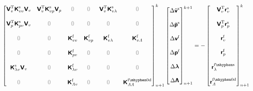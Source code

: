 \documentclass[a4paper,12pt]{report}
\newcommand{\fS}{\text{s}}
\newcommand{\fF}{\text{f}}
\newcommand{\bs}[1]{\boldsymbol{#1}}
\newcommand{\zerom}{\textcolor{lightgray}{\bs{\mathsf{0}}}}
\newcommand{\ROP}{\bs{\mathsf{r}}}
\newcommand{\VF}{\bs{\mathsf{v}}^{\fF}}
\newcommand{\PF}{\bs{\mathsf{p}}^{\fF}}
\newcommand{\LM}{\bs{\mathsf{\lambda}}}
\newcommand{\LMZ}{\bs{\mathsf{\Lambda}}}
\newcommand{\lmi}{\lambda} %
\newcommand{\lmzi}{\mathit{\Lambda}} %
\begin{document}
\begin{align}
    \begin{bmatrix} \bs{\mathsf{V}}_{v}^{\mathrm{T}}\bs{\mathsf{K}}_{vv}^{\fS}\bs{\mathsf{V}}_{v} & \bs{\mathsf{V}}_{v}^{\mathrm{T}}\bs{\mathsf{K}}_{vp}^{\fS}\bs{\mathsf{V}}_{p} & \zerom & \zerom & \bs{\mathsf{V}}_{v}^{\mathrm{T}}\bs{\mathsf{K}}_{v\lmi}^{\fS} & \zerom  \\ \\ \bs{\mathsf{V}}_{p}^{\mathrm{T}}\bs{\mathsf{K}}_{pv}^{\fS}\bs{\mathsf{V}}_{v} & \zerom & \zerom & \zerom & \zerom & \zerom \\ \\ \zerom & \zerom & \bs{\mathsf{K}}_{vv}^{\fF} & \bs{\mathsf{K}}_{vp}^{\fF} & \bs{\mathsf{K}}_{v\lmi}^{\fF} & \bs{\mathsf{K}}_{v\lmzi}^{\fF} \\ \\ \zerom & \zerom & \bs{\mathsf{K}}_{pv}^{\fF} & \zerom & \zerom & \zerom \\ \\ \bs{\mathsf{K}}_{\lmi v}^{\fS}\bs{\mathsf{V}}_{v} & \zerom & \bs{\mathsf{K}}_{\lmi v}^{\fF} & \zerom & \zerom & \zerom \\ \\ \zerom & \zerom & \bs{\mathsf{K}}_{\lmzi v}^{\fF} & \zerom & \zerom & \bs{\mathsf{K}}_{\lmzi\lmzi}^{\mathrm{\fF\mhyphen 0d}}\end{bmatrix}_{n+1}^{k}\begin{bmatrix} \Delta\tilde{\bs{\mathsf{v}}}^{\fS} \\ \\ \Delta\tilde{\bs{\mathsf{p}}}^{\fS} \\ \\ \Delta\VF \\ \\ \Delta\PF \\ \\ \Delta\LM \\ \\ \Delta\LMZ \end{bmatrix}_{n+1}^{k+1}=-\begin{bmatrix} \bs{\mathsf{V}}_{v}^{\mathrm{T}}\ROP_{v}^{\fS} \\ \\ \bs{\mathsf{V}}_{p}^{\mathrm{T}}\ROP_{p}^{\fS} \\ \\ \ROP_{v}^{\fF} \\ \\ \ROP_{p}^{\fF} \\ \\ \ROP_{\lmi}^{\mathrm{\fF\mhyphen\fS}} \\ \\ \ROP_{\lmzi}^{\mathrm{\fF\mhyphen 0d}}\end{bmatrix}_{n+1}^{k} \label{eq:lin_sys_f3drsi}
\end{align}
\end{document}
